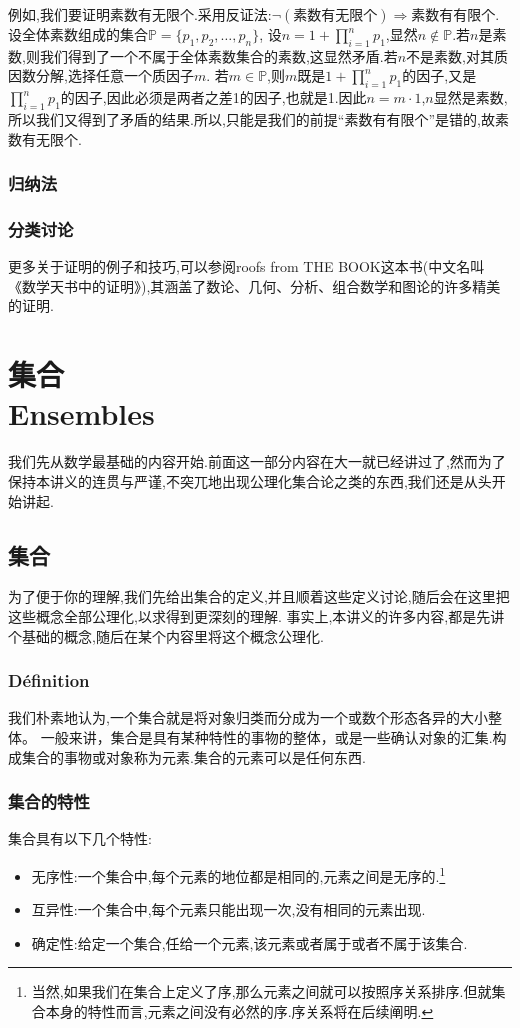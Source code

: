 \documentclass[12pt, a4paper, oneside]{ctexbook}
\begin{document}
  
  例如,我们要证明素数有无限个.采用反证法:$\lnot(\text{素数有无限个})\Rightarrow \text{素数有有限个} $.设全体素数组成的集合$\mathbb{P}=\{p_1,p_2,\dots,p_n\}$,
  设$n=1+\prod _{i=1}^{n}p_1$,显然$n\notin \mathbb{P}$.若$n$是素数,则我们得到了一个不属于全体素数集合的素数,这显然矛盾.若$n$不是素数,对其质因数分解,选择任意一个质因子$m$.
  若$m\in \mathbb{P}$,则$m$既是$1+\prod _{i=1}^{n}p_1$的因子,又是$\prod _{i=1}^{n}p_1$的因子,因此必须是两者之差1的因子,也就是1.因此$n=m\cdot 1$,$n$显然是素数,
  所以我们又得到了矛盾的结果.所以,只能是我们的前提“素数有有限个”是错的,故素数有无限个.
  \subsection{归纳法}
  
  \subsection{分类讨论}



  
  更多关于证明的例子和技巧,可以参阅roofs from THE BOOK这本书(中文名叫《数学天书中的证明》),其涵盖了数论、几何、分析、组合数学和图论的许多精美的证明.
\chapter{集合\\ Ensembles}
  我们先从数学最基础的内容开始.前面这一部分内容在大一就已经讲过了,然而为了保持本讲义的连贯与严谨,不突兀地出现公理化集合论之类的东西,我们还是从头开始讲起.
\section{集合}
  为了便于你的理解,我们先给出集合的定义,并且顺着这些定义讨论,随后会在这里把这些概念全部公理化,以求得到更深刻的理解.
  事实上,本讲义的许多内容,都是先讲个基础的概念,随后在某个内容里将这个概念公理化.
  \subsection{Définition}
  我们朴素地认为,一个集合就是将对象归类而分成为一个或数个形态各异的大小整体。
  一般来讲，集合是具有某种特性的事物的整体，或是一些确认对象的汇集.构成集合的事物或对象称为元素.集合的元素可以是任何东西.
  \subsection{集合的特性}
  集合具有以下几个特性:
  \begin{itemize}
    \item 无序性:一个集合中,每个元素的地位都是相同的,元素之间是无序的.\footnote{
      当然,如果我们在集合上定义了序,那么元素之间就可以按照序关系排序.但就集合本身的特性而言,元素之间没有必然的序.序关系将在后续阐明.
    }
    \item 互异性:一个集合中,每个元素只能出现一次,没有相同的元素出现.
    \item 确定性:给定一个集合,任给一个元素,该元素或者属于或者不属于该集合.\label{myref:quedingxing}
  \end{itemize}
\end{document}
